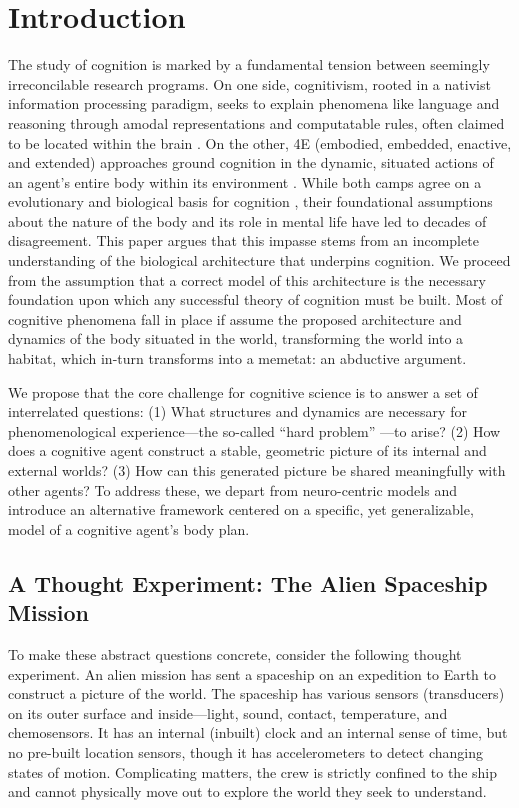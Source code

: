 \section{Introduction}
\label{sec:introduction}
The study of cognition is marked by a fundamental tension between seemingly irreconcilable research programs. On one side, cognitivism, rooted in a nativist information processing paradigm, seeks to explain phenomena like language and reasoning through amodal representations and computatable rules, often claimed to be located within the brain \cite{chomsky1965aspects, fodor_modularity_1983}. On the other, 4E (embodied, embedded, enactive, and extended) approaches ground cognition in the dynamic, situated actions of an agent's entire body within its environment \cite{varela1991embodied,  maturana1991autopoiesis, noe_action_2004}. While both camps agree on a evolutionary and biological basis for cognition \cite{chomsky1965aspects, varela1991embodied}, their foundational assumptions about the nature of the body and its role in mental life have led to decades of disagreement. This paper argues that this impasse stems from an incomplete understanding of the biological architecture that underpins cognition. We proceed from the assumption that a correct model of this architecture is the necessary foundation upon which any successful theory of cognition must be built. Most of cognitive phenomena fall in place if assume the proposed architecture and dynamics of the body situated in the world, transforming the world into a habitat, which in-turn transforms into a memetat: an abductive argument.

We propose that the core challenge for cognitive science is to answer a set of interrelated questions: (1) What structures and dynamics are necessary for phenomenological experience—the so-called ``hard problem'' \cite{chalmers1995facing}—to arise? (2) How does a cognitive agent construct a stable, geometric picture of its internal and external worlds? (3) How can this generated picture be shared meaningfully with other agents? To address these, we depart from neuro-centric models and introduce an alternative framework centered on a specific, yet generalizable, model of a cognitive agent's body plan.

\subsection{A Thought Experiment: The Alien Spaceship Mission}
To make these abstract questions concrete, consider the following thought experiment. An alien mission has sent a spaceship on an expedition to Earth to construct a picture of the world. The spaceship has various sensors (transducers) on its outer surface and inside—light, sound, contact, temperature, and chemosensors. It has an internal (inbuilt) clock and an internal sense of time, but no pre-built location sensors, though it has accelerometers to detect changing states of motion. Complicating matters, the crew is strictly confined to the ship and cannot physically move out to explore the world they seek to understand.

